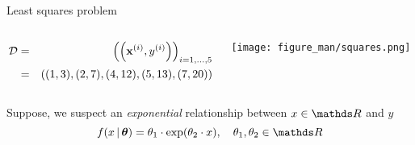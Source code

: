 \documentclass[11pt,compress,t,notes=noshow, xcolor=table]{beamer}
\begin{document}
\begin{vbframe}{Least squares problem}
\begin{columns}
\begin{column}{0.55\textwidth}
\begin{footnotesize}
\begin{eqnarray*}
\mathcal{D} &=& \left(\left(\mathbf{x}^{(i)}, y^{(i)}\right)\right)_{i = 1, ..., 5} \\ &=& \left((1,3),(2,7),(4,12),(5,13),(7,20)\right)
\end{eqnarray*}
\end{footnotesize}
\end{column}
\begin{column}{0.4\textwidth}
	\vspace*{-0.5cm}  
    \begin{center}
     \texttt{[image: figure\_man/squares.png]}
     \end{center}
\end{column}
\end{columns}







\framebreak

Suppose, we suspect an \textit{exponential} relationship between $x \in \R$ and $y$ 
\begin{equation*}
    f(x \,|\, \thetav) = \theta_1 \cdot \exp(\theta_2 \cdot x), \quad \theta_1, \theta_2 \in \R
\end{equation*}




\end{vbframe}
\end{document}
